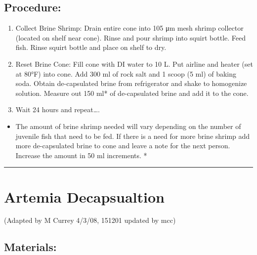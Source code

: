 \documentclass[
]{book}
\providecommand{\tightlist}{%
  \setlength{\itemsep}{0pt}\setlength{\parskip}{0pt}}
\begin{document}
\hypertarget{procedure}{%
\subsection{Procedure:}\label{procedure}}

\begin{enumerate}
\def\labelenumi{\arabic{enumi}.}
\tightlist
\item
  Collect Brine Shrimp: Drain entire cone into 105 μm mesh shrimp collector (located on shelf near cone). Rinse and pour shrimp into squirt bottle. Feed fish. Rinse squirt bottle and place on shelf to dry.
\item
  Reset Brine Cone: Fill cone with DI water to 10 L. Put airline and heater (set at 80°F) into cone. Add 300 ml of rock salt and 1 scoop (5 ml) of baking soda. Obtain de-capsulated brine from refrigerator and shake to homogenize solution. Measure out 150 ml* of de-capsulated brine and add it to the cone.
\item
  Wait 24 hours and repeat\ldots.
\end{enumerate}

\begin{itemize}
\tightlist
\item
  The amount of brine shrimp needed will vary depending on the number of juvenile fish that need to be fed. If there is a need for more brine shrimp add more de-capsulated brine to cone and leave a note for the next person. Increase the amount in 50 ml increments. *
\end{itemize}

\begin{center}\rule{0.5\linewidth}{0.5pt}\end{center}

\hypertarget{artemia-decapsualtion}{%
\section{Artemia Decapsualtion}\label{artemia-decapsualtion}}

(Adapted by M Currey 4/3/08, 151201 updated by mcc)

\hypertarget{materials-2}{%
\subsection{Materials:}\label{materials-2}}
\end{document}
